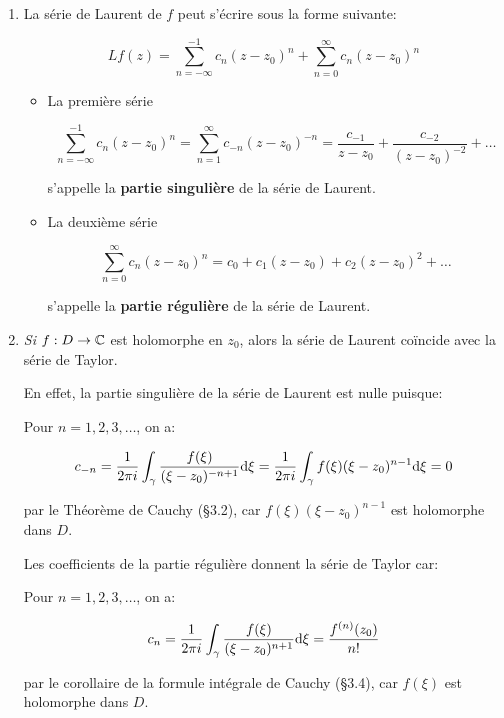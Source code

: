 \begin{remark}\hfill
    
    \begin{enumerate}[label=\alph*)]
        \item 
        La série de Laurent de $f$ peut s'écrire sous la forme suivante:
        
        \[ Lf(z) = \sum_{n = -\infty}^{-1} c_n(z - z_0)^n + \sum_{n = 0}^{\infty} c_n(z - z_0)^n \]
        
        \begin{itemize}
        \item 
        La première série
        
        \[
        \sum_{n = -\infty}^{-1} c_n(z - z_0)^n =
        \sum_{n = 1}^{\infty} c_{-n}(z - z_0)^{-n} =
        \frac{c_{-1}}{z - z_0} + \frac{c_{-2}}{(z - z_0)^{-2}} + \ldots
        \]
        
        s'appelle la \textbf{partie singulière} de la série de Laurent.
        
        \item 
        La deuxième série
        
        \[
        \sum_{n = 0}^{\infty} c_n(z - z_0)^n =
        c_0 + c_1(z - z_0) + c_2(z - z_0)^2 + \ldots
        \]
        
        s'appelle la \textbf{partie régulière} de la série de Laurent.
        \end{itemize}

        \item 
        \textit{Si} $f: D \rightarrow \mathbb{C}$ est holomorphe en $z_0$, alors la série de Laurent coïncide avec la série de Taylor.
        
        En effet, la partie singulière de la série de Laurent est nulle puisque:
        
        Pour $n = 1, 2, 3, \ldots$, on a:
        
        \[ c_{-n} =  \frac{1}{2 \pi i} \int_\gamma \frac{f(\xi)}{(\xi - z_0)^{-n + 1}} \mathrm{d}\xi
        = \frac{1}{2 \pi i} \int_\gamma f(\xi)(\xi - z_0)^{n - 1} \mathrm{d}\xi
        = 0 \]
        
        par le Théorème de Cauchy (§3.2), car $f(\xi)(\xi - z_0)^{n - 1}$ est holomorphe dans $D$.
        
        Les coefficients de la partie régulière donnent la série de Taylor car:
        
        Pour $n = 1, 2, 3, \ldots$, on a:
        
        \[ c_{n} =  \frac{1}{2 \pi i} \int_\gamma \frac{f(\xi)}{(\xi - z_0)^{n + 1}} \mathrm{d}\xi
        = \frac{f^{(n)}(z_0)}{n!}\]
        
        par le corollaire de la formule intégrale de Cauchy (§3.4), car $f(\xi)$ est holomorphe dans $D$.
    \end{enumerate}
\end{remark}

